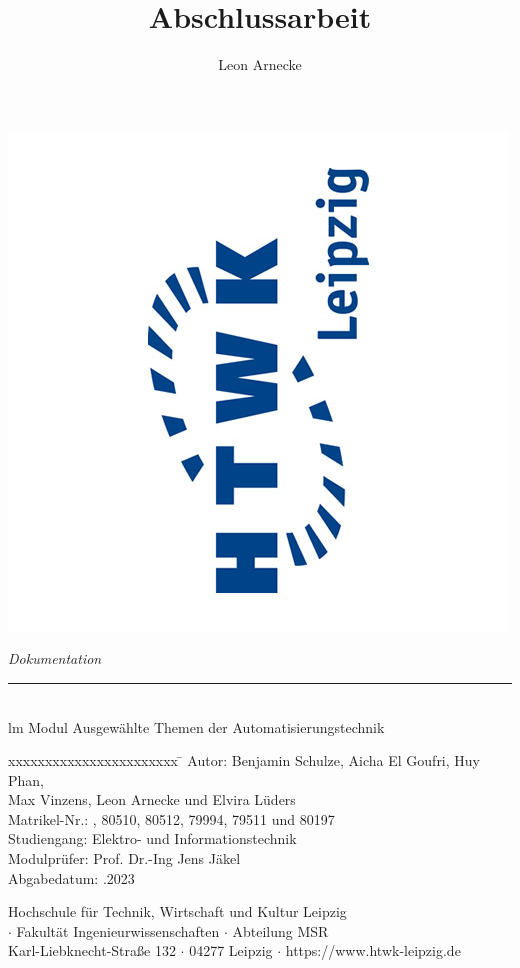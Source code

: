 \documentclass[10pt,a4paper]{report}
\title{Abschlussarbeit}
\author{Leon Arnecke}
\begin{document}
	\begin{titlepage}
		\begin{flushleft}
			\includegraphics[scale=0.3]{HTWK_Logo.jpg}
		\end{flushleft}
		
		\begin{flushright}
			\vspace{2cm}
			\LARGE \textsl{Dokumentation} \\
			\rule{0.6\textwidth}{0.4pt} ~\\
			\vspace{0.5cm}
			\textsf{\LARGE lm Modul Ausgewählte Themen der Automatisierungstechnik}
		\end{flushright}
		
		\vspace{3cm}
		\large
		\begin{tabbing}
			xxxxxxxxxxxxxxxxxxxxxxx \= \kill
			Autor: \> Benjamin Schulze, Aicha El Goufri, Huy Phan, \\\>Max Vinzens, Leon Arnecke und Elvira Lüders \\
			Matrikel-Nr.: , 80510, 80512, 79994, 79511 und 80197 \\
			Studiengang:  \> Elektro- und Informationstechnik \\ [0.5cm]
			Modulprüfer: \> Prof. Dr.-Ing Jens Jäkel \\ [0.5cm]
			Abgabedatum: .2023 \\
		\end{tabbing}
		
		\vspace{4cm}
		\small
		\begin{center}
			Hochschule für Technik, Wirtschaft und Kultur Leipzig \\$\cdot$
			Fakultät Ingenieurwissenschaften $\cdot$
			Abteilung MSR \\
			Karl-Liebknecht-Straße 132 $\cdot$
			04277 Leipzig $\cdot$
			https://www.htwk-leipzig.de
		\end{center}
	\end{titlepage}
\end{document}
